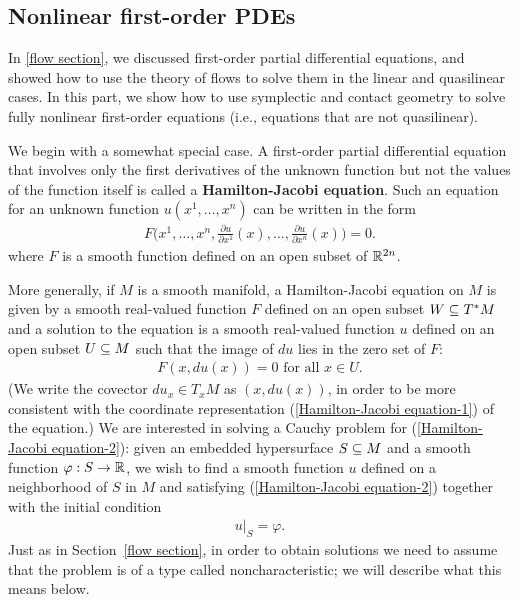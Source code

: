 \subsection{Nonlinear first-order PDEs}
In \autoref{flow section}, we discussed first-order partial differential equations, and showed how to use the theory of flows to solve them in the linear and quasilinear cases. In this part, we show how to use symplectic and contact geometry to solve fully nonlinear first-order equations (i.e., equations that are not quasilinear).\par
We begin with a somewhat special case. A first-order partial differential equation that involves only the first derivatives of the unknown function but not the values of the function itself is called a \textbf{Hamilton-Jacobi equation}. Such an equation for an unknown function $u(x^1,\dots,x^n)$ can be written in the form
\begin{align}\label{Hamilton-Jacobi equation-1}
F\Big(x^1,\dots,x^n,\frac{\partial u}{\partial x^1}(x),\dots,\frac{\partial u}{\partial x^n}(x))=0.
\end{align}
where $F$ is a smooth function defined on an open subset of $\mathbb{R}^{2n}$.\par
More generally, if $M$ is a smooth manifold, a Hamilton-Jacobi equation on $M$ is given by a smooth real-valued function $F$ defined on an open subset $W\subseteq T^*M$ and a solution to the equation is a smooth real-valued function $u$ defined on an open subset $U\subseteq M$ such that the image of $du$ lies in the zero set of $F$:
\begin{align}\label{Hamilton-Jacobi equation-2}
F(x,du(x))=0\text{ for all }x\in U.
\end{align}
(We write the covector $du_x\in T_xM$ as $(x,du(x))$, in order to be more consistent with the coordinate representation (\ref{Hamilton-Jacobi equation-1}) of the equation.) We are interested in solving a Cauchy problem for (\ref{Hamilton-Jacobi equation-2}): given an embedded hypersurface $S\subseteq M$ and a smooth function $\varphi:S\to\mathbb{R}$, we wish to find a smooth function $u$ defined on a neighborhood of $S$ in $M$ and satisfying (\ref{Hamilton-Jacobi equation-2}) together with the initial condition
\begin{align}\label{Hamilton-Jacobi equation boundary}
u|_S=\varphi.
\end{align}
Just as in Section~\ref{flow section}, in order to obtain solutions we need to assume that the problem is of a type called noncharacteristic; we will describe what this means below.\par
